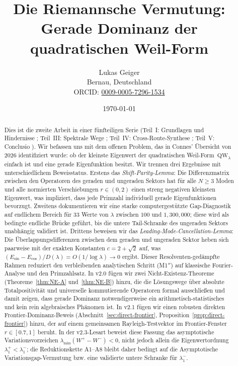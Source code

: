 ﻿\documentclass[12pt,a4paper]{article}
\title{Die Riemannsche Vermutung:\\ Gerade Dominanz der quadratischen Weil-Form}
\author{Lukas Geiger\\
\small Bernau, Deutschland\\
\small ORCID: \href{https://orcid.org/0009-0005-7296-1534}{0009-0005-7296-1534}}
\date{\today}
\theoremstyle{definition}
\theoremstyle{remark}
\begin{document}
\overfullrule=0pt
\maketitle

\begin{abstract}\small
Dies ist die zweite Arbeit in einer fünfteiligen Serie (Teil~I: Grundlagen und Hindernisse \cite{Geiger2026partI}; Teil~III: Spektrale Wege \cite{Geiger2026partIII}; Teil~IV: Cross-Route-Synthese \cite{Geiger2026partIV}; Teil~V: Conclusio \cite{Geiger2026partV}). Wir befassen uns mit dem offenen Problem, das in Connes' \"Ubersicht von 2026 \cite{Connes2026} identifiziert wurde: ob der kleinste Eigenwert der quadratischen Weil-Form~$\mathrm{QW}_\lambda$ einfach ist und eine gerade Eigenfunktion besitzt. Wir trennen drei Ergebnisse mit unterschiedlichem Beweisstatus. Erstens das \emph{Shift-Parity-Lemma}: Die Differenzmatrix zwischen den Operatoren des geraden und ungeraden Sektors hat f\"ur alle $N \geq 3$ Moden und alle normierten Verschiebungen $r \in (0,2)$ einen streng negativen kleinsten Eigenwert, was impliziert, dass jede Primzahl individuell gerade Eigenfunktionen bevorzugt. Zweitens dokumentieren wir eine starke computergestützte Gap-Diagnostik auf endlichem Bereich für $33$ Werte von $\lambda$ zwischen $100$ und $1{,}300{,}000$; diese wird als bedingte endliche Brücke geführt, bis die untere Tail-Schranke des ungeraden Sektors unabhängig validiert ist. Drittens beweisen wir das \emph{Leading-Mode-Cancellation-Lemma}: Die \"Uberlappungsdifferenzen zwischen dem geraden und ungeraden Sektor heben sich paarweise mit der exakten Konstanten $c = 2 + \sqrt{2}$ auf, was $(E_{\sin} - E_{\cos})/D(\lambda) = O(1/\log\lambda) \to 0$ ergibt. Dieser Resolventen-ged\"ampfte Rahmen reduziert den verbleibenden analytischen Schritt (M1$''$) auf klassische Fourier-Analyse und den Primzahlsatz. In v2.0 f\"ugen wir zwei Nicht-Existenz-Theoreme (Theoreme~\ref{thm:NE-A} und~\ref{thm:NE-B}) hinzu, die die L\"osungswege \"uber absolute Totalpositivit\"at und universelle kommutierende Operatoren formal ausschlie\ss{}en und damit zeigen, dass gerade Dominanz notwendigerweise ein arithmetisch-statistisches und kein rein algebraisches Ph\"anomen ist. In v2.1 f\"ugen wir einen robusten direkten Frontier-Dominanz-Beweis (Abschnitt~\ref{sec:direct-frontier}, Proposition~\ref{prop:direct-frontier}) hinzu, der auf einem gemeinsamen Rayleigh-Testvektor im Frontier-Fenster $r\in[0.7,1]$ beruht. In der v2.3-Lesart beweist diese Fassung das asymptotische Variationsvorzeichen $\lambda_{\min}(W^+-W^-)<0$, nicht jedoch allein die Eigenwertordnung $\lambda_1^+<\lambda_1^-$; die Reduktionskette A1--A8 bleibt daher bedingt auf die Asymptotische Variationsgap-Vermutung bzw. eine validierte untere Schranke für $\lambda_1^-$.


\end{abstract}
\end{document}
